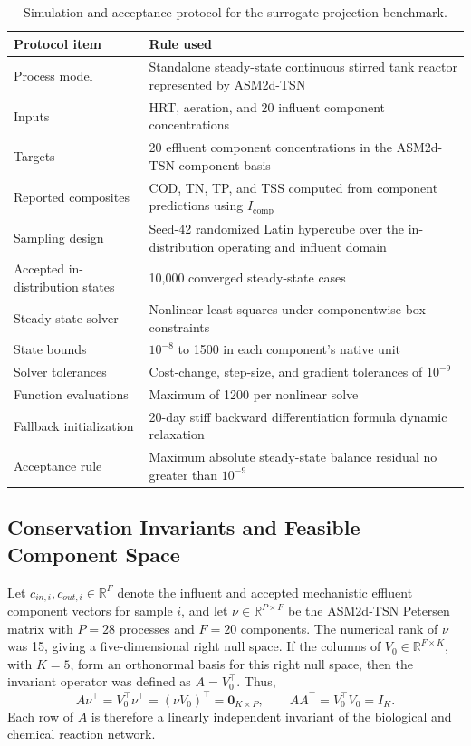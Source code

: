 \documentclass[12pt, twoside]{book}
\begin{document}
\begin{table}[htbp]
\centering
\caption{Simulation and acceptance protocol for the surrogate-projection benchmark.}
\label{tab:ch2_simulation_protocol}
\scriptsize
\setlength{\tabcolsep}{4pt}
\begin{tabular}{p{4.0cm}p{8.8cm}}
\toprule
Protocol item & Rule used \\
\midrule
Process model & Standalone steady-state continuous stirred tank reactor represented by ASM2d-TSN \\
Inputs & HRT, aeration, and 20 influent component concentrations \\
Targets & 20 effluent component concentrations in the ASM2d-TSN component basis \\
Reported composites & COD, TN, TP, and TSS computed from component predictions using \(I_{\mathrm{comp}}\) \\
Sampling design & Seed-42 randomized Latin hypercube over the in-distribution operating and influent domain \\
Accepted in-distribution states & 10,000 converged steady-state cases \\
Steady-state solver & Nonlinear least squares under componentwise box constraints \\
State bounds & \(10^{-8}\) to 1500 in each component's native unit \\
Solver tolerances & Cost-change, step-size, and gradient tolerances of \(10^{-9}\) \\
Function evaluations & Maximum of 1200 per nonlinear solve \\
Fallback initialization & 20-day stiff backward differentiation formula dynamic relaxation \\
Acceptance rule & Maximum absolute steady-state balance residual no greater than \(10^{-9}\) \\
\bottomrule
\end{tabular}
\end{table}

\subsection{Conservation Invariants and Feasible Component Space}

Let \(c_{in,i},c_{out,i}\in\mathbb{R}^{F}\) denote the influent and accepted mechanistic effluent component
vectors for sample \(i\), and let \(\nu\in\mathbb{R}^{P\times F}\) be the ASM2d-TSN Petersen matrix with
\(P=28\) processes and \(F=20\) components. The numerical rank of \(\nu\) was 15, giving a five-dimensional
right null space. If the columns of \(V_0\in\mathbb{R}^{F\times K}\), with \(K=5\), form an orthonormal basis
for this right null space, then the invariant operator was defined as \(A=V_0^\top\). Thus,
\begin{equation}
\label{eq:ch2_invariant_operator}
A\nu^\top=V_0^\top\nu^\top=(\nu V_0)^\top=\mathbf{0}_{K\times P},
\qquad
AA^\top=V_0^\top V_0=I_K.
\end{equation}
Each row of \(A\) is therefore a linearly independent invariant of the biological and chemical reaction
network.
\end{document}
